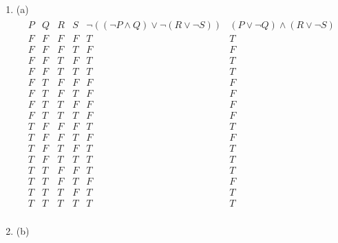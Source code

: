\documentclass[11pt,a4paper]{article}
\begin{document}
\begin{enumerate}
\begin{enumerate}
                \begin{enumerate}
                    \item (a)
                    \begin{align*}
                        \begin{array}{|c|c|c|c|c|c|}
                            P & Q & R & S & \neg((\neg P\land Q)\lor\neg(R\lor\neg S)) & (P \lor\neg Q)\land(R\lor\neg S)\\
                        \hline
                            F & F & F & F & T & T\\
                            F & F & F & T & F & F\\
                            F & F & T & F & T & T\\
                            F & F & T & T & T & T\\
                            F & T & F & F & F & F\\
                            F & T & F & T & F & F\\
                            F & T & T & F & F & F\\
                            F & T & T & T & F & F\\
                            T & F & F & F & T & T\\
                            T & F & F & T & F & F\\
                            T & F & T & F & T & T\\
                            T & F & T & T & T & T\\
                            T & T & F & F & T & T\\
                            T & T & F & T & F & F\\
                            T & T & T & F & T & T\\
                            T & T & T & T & T & T\\
                        \end{array}
                    \end{align*}
                \item (b)


\end{enumerate}
\end{enumerate}
\end{enumerate}
\end{document}
